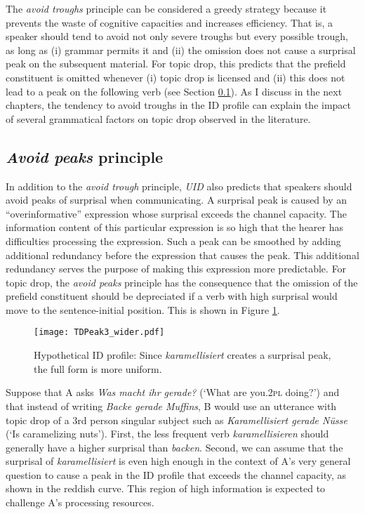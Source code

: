 The \textit{avoid troughs} principle can be considered a greedy strategy because it prevents the waste of cognitive capacities and increases efficiency.  
That is, a speaker should tend to avoid not only severe troughs but every possible trough, as long as (i) grammar permits it and (ii) the omission does not cause a surprisal peak on the subsequent material.
For topic drop, this predicts that the prefield constituent is omitted whenever (i) topic drop is licensed and (ii) this does not lead to a peak on the following verb (see Section \ref{sec:avoid.peaks}).
As I discuss in the next chapters, the tendency to avoid troughs in the ID profile can explain the impact of several grammatical factors on topic drop observed in the literature.

\subsection{\textit{Avoid peaks} principle}\label{sec:avoid.peaks}
In addition to the \textit{avoid trough} principle, \textit{UID} also predicts that speakers should avoid peaks of surprisal when communicating.
A surprisal peak is caused by an ``overinformative'' expression whose surprisal exceeds the channel capacity.  
The information content of this particular expression is so high that the hearer has difficulties processing the expression.
Such a peak can be smoothed by adding additional redundancy before the expression that causes the peak.
This additional redundancy serves the purpose of making this expression more predictable. 
For topic drop, the \textit{avoid peaks} principle has the consequence that the omission of the prefield constituent should be depreciated if a verb with high surprisal would move to the sentence-initial position.
This is shown in Figure \ref{fig:tdpeak}.

\begin{figure}
\centering
\texttt{[image: TDPeak3\_wider.pdf]}
\caption{Hypothetical ID profile: Since \textit{karamellisiert} creates a surprisal peak, the full form is more uniform.}
\label{fig:tdpeak}
\end{figure}

Suppose that A asks \textit{Was macht ihr gerade?} (`What are you.\textsc{2pl} doing?') and that instead of writing \textit{Backe gerade Muffins}, B would use an utterance with topic drop of a 3rd person singular subject such as \textit{Karamellisiert gerade Nüsse} (`Is caramelizing nuts').
First, the less frequent verb \textit{karamellisieren} should generally have a higher surprisal than \textit{backen}.
Second, we can assume that the surprisal of \textit{karamellisiert} is even high enough in the context of A's very general question to cause a peak in the ID profile that exceeds the channel capacity,  as shown in the reddish curve.
This region of high information is expected to challenge A's processing resources.

